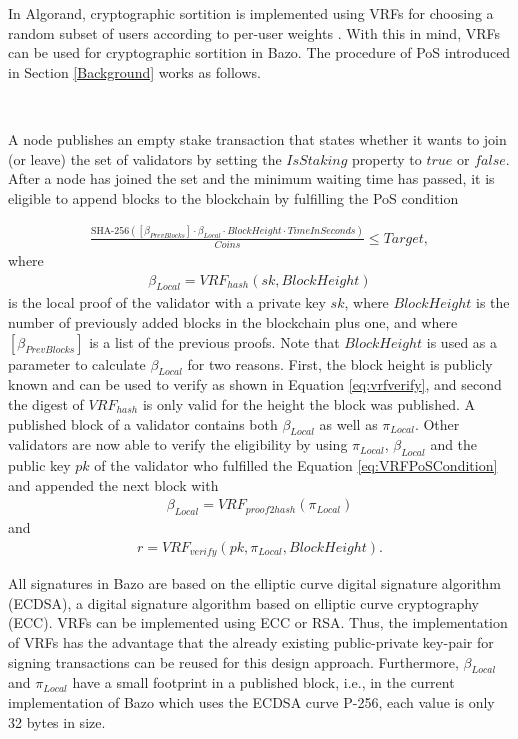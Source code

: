 \documentclass[12pt,a4]{article}
\begin{document}
In Algorand, cryptographic sortition is implemented using VRFs for choosing a random subset of users according to per-user weights \cite{Gilad17}. With this in mind, VRFs can be used for cryptographic sortition in Bazo. The procedure of PoS introduced in Section \ref{Background} works as follows.
\par \

\noindent
A node publishes an empty stake transaction that states whether it wants to join (or leave) the set of validators by setting the $IsStaking$ property to $true$ or $false$. After a node has joined the set and the minimum waiting time has passed, it is eligible to append blocks to the blockchain by fulfilling the PoS condition

\begin{gather}
\label{eq:VRFPoSCondition}
  {\frac{\text{SHA-256}([\beta_{PrevBlocks}] \cdot \beta_{Local} \cdot BlockHeight \cdot TimeInSeconds)}{Coins}} \leq Target,
\end{gather}
where
\begin{gather}
  \beta_{Local} = VRF_{hash}(sk, BlockHeight)
\end{gather}
is the local proof of the validator with a private key $sk$, where $BlockHeight$ is the number of previously added blocks in the blockchain plus one, and where $[\beta_{PrevBlocks}]$ is a list of the previous proofs. Note that $BlockHeight$ is used as a parameter to calculate $\beta_{Local}$ for two reasons. First, the block height is publicly known and can be used to verify as shown in Equation \ref{eq:vrfverify}, and second the digest of $VRF_{hash}$ is only valid for the height the block was published. A published block of a validator contains both $\beta_{Local}$ as well as $\pi_{Local}$. Other validators are now able to verify the eligibility by using $\pi_{Local}$, $\beta_{Local}$ and the public key $pk$ of the validator who fulfilled the Equation \ref{eq:VRFPoSCondition} and appended the next block with
\begin{align}
  \beta_{Local} = VRF_{proof2hash}(\pi_{Local})
\end{align}
and
\begin{align}
\label{eq:vrfverify}
  r = VRF_{verify}(pk, \pi_{Local}, BlockHeight).
\end{align}

All signatures in Bazo are based on the elliptic curve digital signature algorithm (ECDSA), a digital signature algorithm based on elliptic curve cryptography (ECC). VRFs can be implemented using ECC or RSA. Thus, the implementation of VRFs has the advantage that the already existing public-private key-pair for signing transactions can be reused for this design approach. Furthermore, $\beta_{Local}$ and $\pi_{Local}$ have a small footprint in a published block, i.e., in the current implementation of Bazo which uses the ECDSA curve P-256, each value is only 32 bytes in size.
\end{document}
